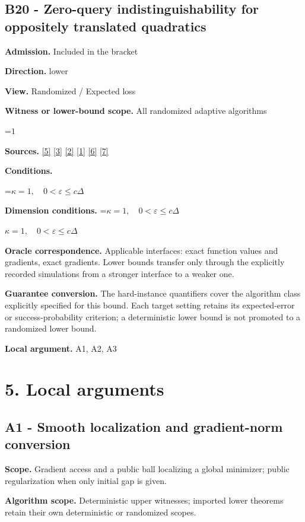 \documentclass[10pt,a4paper]{article}
\newcommand{\AtlasMath}[1]{\par\begingroup\centering\setbox0=\hbox{$\displaystyle #1$}\ifdim\wd0>1.4\linewidth\typeout{ATLAS WIDE FORMULA: \the\wd0}\fi\ifdim\wd0>\linewidth\resizebox{\linewidth}{!}{\box0}\else\box0\fi\par\endgroup}
\newcommand{\AtlasInlineMath}[1]{\begingroup\setbox0=\hbox{$#1$}\ifdim\wd0>.4\linewidth\endgroup\AtlasMath{#1}\else\endgroup$#1$\fi}
\begin{document}
\subsection{B20 - Zero-query indistinguishability for oppositely translated quadratics}
\textbf{Admission.} Included in the bracket

\textbf{Direction.} lower

\textbf{View.} Randomized / Expected loss

\textbf{Witness or lower-bound scope.} All randomized adaptive algorithms

\AtlasMath{1}
\textbf{Sources.} \href{https://arxiv.org/pdf/2101.09740v2}{[5]} \href{https://arxiv.org/pdf/2609.33360v2}{[3]} \href{https://arxiv.org/pdf/2609.10874}{[2]} \href{https://arxiv.org/pdf/1405.4980}{[1]} \href{https://www2.isye.gatech.edu/~nemirovs/MOR_AccuracyCertificates.pdf}{[6]} \href{https://arxiv.org/pdf/2609.20701}{[7]}

\textbf{Conditions.} 
\AtlasMath{\kappa=1,\quad0<\varepsilon\le c\Delta}


\textbf{Dimension conditions.} \AtlasInlineMath{\kappa=1,\quad0<\varepsilon\le c\Delta}

\textbf{Oracle correspondence.} Applicable interfaces: exact function values and gradients, exact gradients. Lower bounds transfer only through the explicitly recorded simulations from a stronger interface to a weaker one.

\textbf{Guarantee conversion.} The hard-instance quantifiers cover the algorithm class explicitly specified for this bound. Each target setting retains its expected-error or success-probability criterion; a deterministic lower bound is not promoted to a randomized lower bound.

\textbf{Local argument.} A1, A2, A3

\section{5. Local arguments}
\subsection{A1 - Smooth localization and gradient-norm conversion}
\textbf{Scope.} Gradient access and a public ball localizing a global minimizer; public regularization when only initial gap is given.

\textbf{Algorithm scope.} Deterministic upper witnesses; imported lower theorems retain their own deterministic or randomized scopes.
\end{document}
